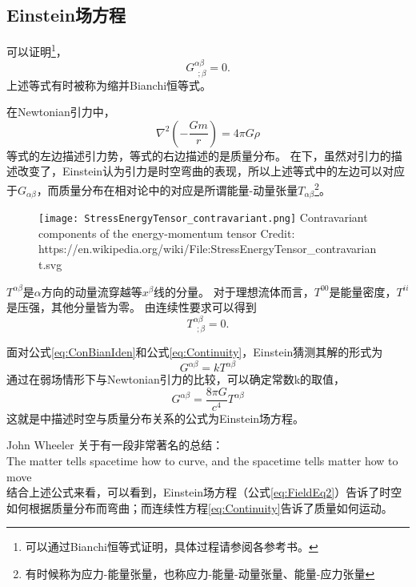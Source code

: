 \subsection{Einstein场方程}

可以证明\footnote{可以通过Bianchi恒等式证明，具体过程请参阅各参考书。}，
\begin{equation}\label{eq:ConBianIden}
  G^{\alpha\beta}_{~~;\beta} =0.
\end{equation}
上述等式有时被称为缩并Bianchi恒等式。

在Newtonian引力中，
\begin{equation}\label{eq:NewtonPoisson}
  \nabla ^2 \left(-\frac{Gm}{r}\right) = 4\pi G \rho
\end{equation}
等式的左边描述引力势，等式的右边描述的是质量分布。
在\GR 下，虽然对引力的描述改变了，Einstein认为引力是时空弯曲的表现，所以上述等式中的左边可以对应于$G_{\alpha\beta}$，而质量分布在相对论中的对应是所谓能量-动量张量$T_{\alpha\beta}$\footnote{有时候称为应力-能量张量，也称应力-能量-动量张量、能量-应力张量}。
\begin{figure}[htp]
\centering
\texttt{[image: StressEnergyTensor\_contravariant.png]}
  {Contravariant components of the energy-momentum tensor Credit: https://en.wikipedia.org/wiki/File:StressEnergyTensor\_contravariant.svg}
\label{fig:ModGrav}
\end{figure}
$T^{\alpha\beta}$是$\alpha$方向的动量流穿越等$x^\beta$线的分量。
对于理想流体而言，$T^{00}$是能量密度，$T^{ii}$是压强，其他分量皆为零。
由连续性要求可以得到
\begin{equation}\label{eq:Continuity}
  T^{\alpha\beta}_{~~;\beta} =0.
\end{equation}
 
面对公式\ref{eq:ConBianIden}和公式\ref{eq:Continuity}，Einstein猜测其解的形式为
\begin{equation}\label{eq:FieldEq1}
  G^{\alpha\beta} =kT^{\alpha\beta}
\end{equation}
通过在弱场情形下与Newtonian引力的比较，可以确定常数k的取值，
\begin{equation}\label{eq:FieldEq2}
  G^{\alpha\beta} =\frac{8\pi G}{c^4}T^{\alpha\beta}
\end{equation}
这就是\GR 中描述时空与质量分布关系的公式为Einstein场方程。

\begin{myprop}{}{}
John Wheeler 关于\GR 有一段非常著名的总结：\\
The matter tells spacetime how to curve, and the spacetime tells matter how to move\\
  结合上述公式来看，可以看到，Einstein场方程（公式\ref{eq:FieldEq2}）告诉了时空如何根据质量分布而弯曲；而连续性方程\ref{eq:Continuity}告诉了质量如何运动。
\end{myprop}
